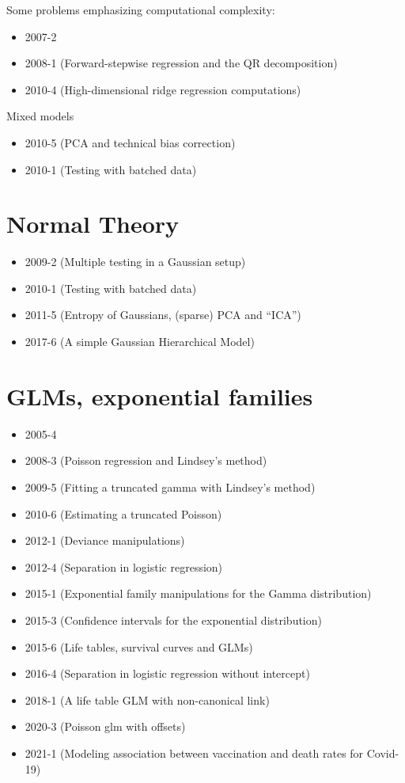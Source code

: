 \documentclass[12pt]{article}
\begin{document}
Some problems emphasizing computational complexity:
\begin{itemize}
	\item 2007-2
	\item 2008-1 (Forward-stepwise regression and the QR decomposition)
	\item 2010-4 (High-dimensional ridge regression computations)
\end{itemize}


Mixed models
\begin{itemize}
\item 2010-5 (PCA and technical bias correction)
\item 2010-1 (Testing with batched data)
\end{itemize}


\section*{Normal Theory}
\begin{itemize}
\item 2009-2 (Multiple testing in a Gaussian setup)
\item 2010-1 (Testing with batched data)
\item 2011-5 (Entropy of Gaussians, (sparse) PCA and ``ICA'')
\item 2017-6 (A simple Gaussian Hierarchical Model)
\end{itemize}

\section*{GLMs, exponential families}
\begin{itemize}
\item 2005-4
\item 2008-3 (Poisson regression and Lindsey's method)
\item 2009-5 (Fitting a truncated gamma with Lindsey's method)
\item 2010-6 (Estimating a truncated Poisson)
\item 2012-1 (Deviance manipulations)
\item 2012-4 (Separation in logistic regression)
\item 2015-1 (Exponential family manipulations for the Gamma distribution)
\item 2015-3 (Confidence intervals for the exponential distribution)
\item 2015-6 (Life tables, survival curves and GLMs)
\item 2016-4 (Separation in logistic regression without intercept)
\item 2018-1 (A life table GLM with non-canonical link)
\item 2020-3 (Poisson glm with offsets)
\item 2021-1 (Modeling association between vaccination and death rates for Covid-19)
\end{itemize}
\end{document}
